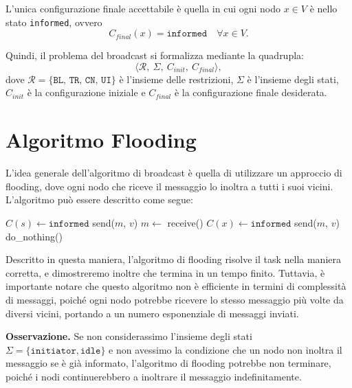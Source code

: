 L'unica configurazione finale accettabile è quella in cui ogni nodo $x \in V$ è nello stato \texttt{informed}, ovvero
\[
    C_{final}(x) = \texttt{informed} \quad \forall x \in V.
\]

Quindi, il problema del broadcast si formalizza mediante la quadrupla:
\[
    \langle \mathcal{R},\ \Sigma,\ C_{init},\ C_{final} \rangle,
\]
dove $\mathcal{R} = \{\texttt{BL, TR, CN, UI}\}$ è l'insieme delle restrizioni, $\Sigma$ è l'insieme degli stati, $C_{init}$ è la configurazione iniziale e $C_{final}$ è la configurazione finale desiderata.

\section{Algoritmo Flooding}

L'idea generale dell'algoritmo di broadcast è quella di utilizzare un approccio di flooding, dove ogni nodo che riceve il messaggio lo inoltra a tutti i suoi vicini. L'algoritmo può essere descritto come segue:
\begin{algorithm}[H]
\caption{Algoritmo di Broadcast (Flooding)}
    \begin{algorithmic}
        \State $C(s) \gets \texttt{informed}$
            \State send($m$, $v$)
        \EndFor
    \EndIf
    \State
        \State $m \gets$ receive() 
        \State $C(x) \gets \texttt{informed}$
            \State send($m$, $v$)
        \EndFor
    \EndIf
    \State
        \State do\_nothing()
    \EndIf
    \end{algorithmic}
\end{algorithm}

Descritto in questa maniera, l'algoritmo di flooding risolve il task nella maniera corretta, e dimostreremo inoltre che termina in un tempo finito. Tuttavia, è importante notare che questo algoritmo non è efficiente in termini di complessità di messaggi, poiché ogni nodo potrebbe ricevere lo stesso messaggio più volte da diversi vicini, portando a un numero esponenziale di messaggi inviati.

\textbf{Osservazione.} Se non considerassimo l'insieme degli stati $\Sigma = \{\texttt{initiator}, \texttt{idle}\}$ e non avessimo la condizione che un nodo non inoltra il messaggio se è già informato, l'algoritmo di flooding potrebbe non terminare, poiché i nodi continuerebbero a inoltrare il messaggio indefinitamente.

